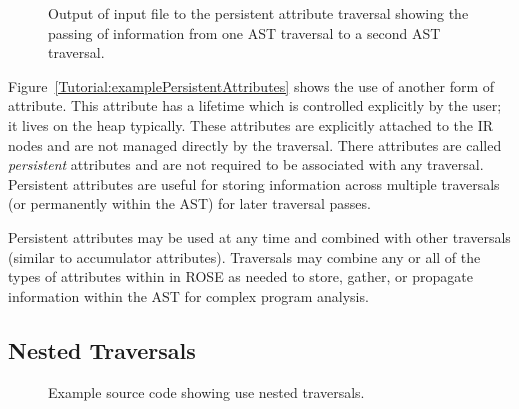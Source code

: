 \begin{figure}[!h]
{\indent
{\mySmallFontSize

\begin{latexonly}
   
\end{latexonly}

\begin{htmlonly}
   
\end{htmlonly}

}
}
\caption{Output of input file to the persistent attribute traversal showing the passing of
    information from one AST traversal to a second AST traversal.}
\label{Tutorial:exampleOutput_PersistentAttributes}
\end{figure}

     Figure~\ref{Tutorial:examplePersistentAttributes} shows the use of
another form of attribute.  This attribute has a lifetime which is controlled explicitly
by the user; it lives on the heap typically.  These attributes are explicitly attached to 
the IR nodes and are not managed directly by the traversal.  There attributes are
called {\em persistent} attributes and are not required to be associated with any
traversal.  Persistent attributes are useful for storing information across multiple
traversals (or permanently within the AST) for later traversal passes.  

   Persistent attributes may be used at any time and combined with other traversals
(similar to accumulator attributes).  Traversals may combine any or all of the
types of attributes within in ROSE as needed to store, gather, or propagate
information within the AST for complex program analysis.







\clearpage
\subsection{Nested Traversals}

\begin{figure}[!h]
{\indent
{\mySmallFontSize


\begin{latexonly}
   
\end{latexonly}

\begin{htmlonly}
   
\end{htmlonly}

}
}
\caption{Example source code showing use nested traversals.}
\label{Tutorial:exampleNestedTraversal}
\end{figure}



